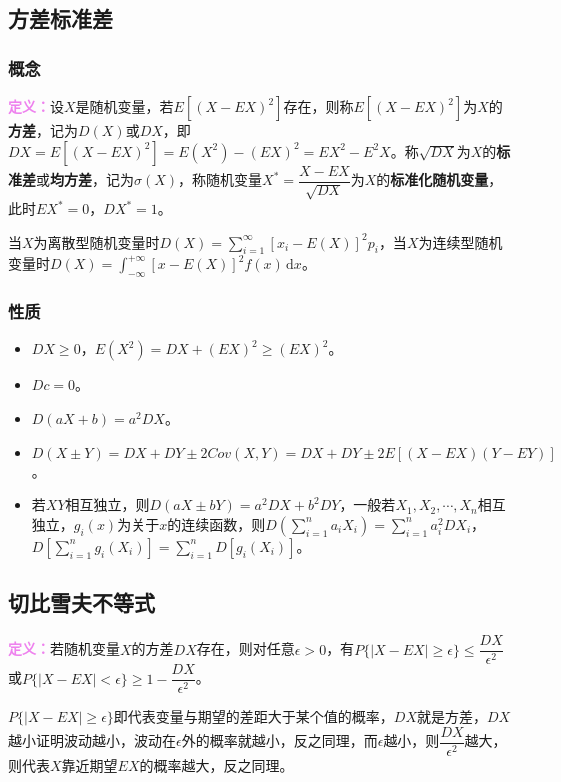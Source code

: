 \documentclass[UTF8, 12pt]{ctexart}
\begin{document}
\subsection{方差标准差}

\subsubsection{概念}

\textcolor{violet}{\textbf{定义：}}设$X$是随机变量，若$E[(X-EX)^2]$存在，则称$E[(X-EX)^2]$为$X$的\textbf{方差}，记为$D(X)$或$DX$，即$DX=E[(X-EX)^2]=E(X^2)-(EX)^2=EX^2-E^2X$。称$\sqrt{DX}$为$X$的\textbf{标准差}或\textbf{均方差}，记为$\sigma(X)$，称随机变量$X^*=\dfrac{X-EX}{\sqrt{DX}}$为$X$的\textbf{标准化随机变量}，此时$EX^*=0$，$DX^*=1$。

当$X$为离散型随机变量时$D(X)=\sum\limits_{i=1}^\infty[x_i-E(X)]^2p_i$，当$X$为连续型随机变量时$D(X)=\int_{-\infty}^{+\infty}[x-E(X)]^2f(x)\,\textrm{d}x$。

\subsubsection{性质}

\begin{itemize}
    \item $DX\geqslant0$，$E(X^2)=DX+(EX)^2\geqslant(EX)^2$。
    \item $Dc=0$。
    \item $D(aX+b)=a^2DX$。
    \item $D(X\pm Y)=DX+DY\pm2Cov(X,Y)=DX+DY\pm2E[(X-EX)(Y-EY)]$。
    \item 若$XY$相互独立，则$D(aX\pm bY)=a^2DX+b^2DY$，一般若$X_1,X_2,\cdots,X_n$相互独立，$g_i(x)$为关于$x$的连续函数，则$D\left(\sum\limits_{i=1}^na_iX_i\right)=\sum\limits_{i=1}^na_i^2DX_i$，$D\left[\sum\limits_{i=1}^ng_i(X_i)\right]=\sum\limits_{i=1}^nD[g_i(X_i)]$。
\end{itemize}

\subsection{切比雪夫不等式}

\textcolor{violet}{\textbf{定义：}}若随机变量$X$的方差$DX$存在，则对任意$\epsilon>0$，有$P\{\vert X-EX\vert\geqslant\epsilon\}\leqslant\dfrac{DX}{\epsilon^2}$或$P\{\vert X-EX\vert<\epsilon\}\geqslant1-\dfrac{DX}{\epsilon^2}$。

$P\{\vert X-EX\vert\geqslant\epsilon\}$即代表变量与期望的差距大于某个值的概率，$DX$就是方差，$DX$越小证明波动越小，波动在$\epsilon$外的概率就越小，反之同理，而$\epsilon$越小，则$\dfrac{DX}{\epsilon^2}$越大，则代表$X$靠近期望$EX$的概率越大，反之同理。
\end{document}
